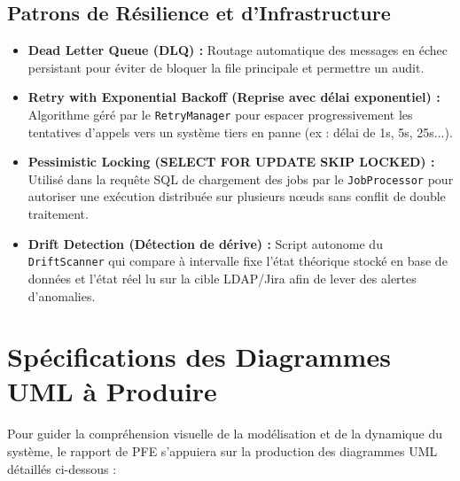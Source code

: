 \subsection{Patrons de Résilience et d'Infrastructure}
\begin{itemize}
    \item \textbf{Dead Letter Queue (DLQ) :} Routage automatique des messages en échec persistant pour éviter de bloquer la file principale et permettre un audit.
    \item \textbf{Retry with Exponential Backoff (Reprise avec délai exponentiel) :} Algorithme géré par le \texttt{RetryManager} pour espacer progressivement les tentatives d'appels vers un système tiers en panne (ex : délai de 1s, 5s, 25s...).
    \item \textbf{Pessimistic Locking (SELECT FOR UPDATE SKIP LOCKED) :} Utilisé dans la requête SQL de chargement des jobs par le \texttt{JobProcessor} pour autoriser une exécution distribuée sur plusieurs nœuds sans conflit de double traitement.
    \item \textbf{Drift Detection (Détection de dérive) :} Script autonome du \texttt{DriftScanner} qui compare à intervalle fixe l'état théorique stocké en base de données et l'état réel lu sur la cible LDAP/Jira afin de lever des alertes d'anomalies.
\end{itemize}

\section{Spécifications des Diagrammes UML à Produire}
Pour guider la compréhension visuelle de la modélisation et de la dynamique du système, le rapport de PFE s'appuiera sur la production des diagrammes UML détaillés ci-dessous :

